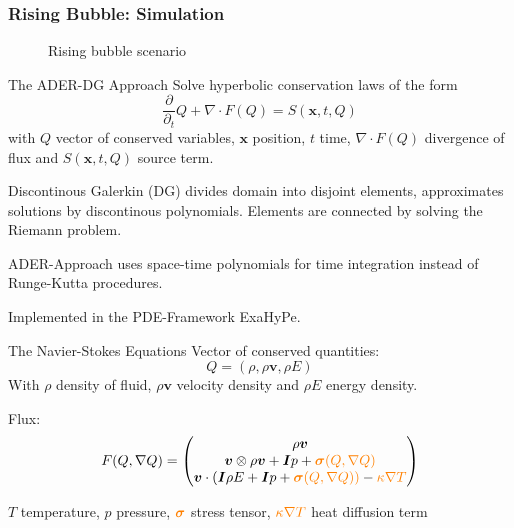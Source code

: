 \documentclass{beamer}
\newcommand{\Qrho}{\ensuremath{\rho}}
\newcommand{\Qj}{\ensuremath{\rho \bm{v}}}
\newcommand{\Qv}{\ensuremath{\bm{v}}}
\newcommand{\QE}{\ensuremath{\rho E}}
\newcommand{\stressT}{\ensuremath{\bm{\sigma}}}
\newcommand{\pressure}{\ensuremath{p}}
\begin{document}
\begin{frame}
  \frametitle{Rising Bubble: Simulation}
   \begin{figure}[h]
    \centering
    \caption{Rising bubble scenario}
  \end{figure}
\end{frame}

\begin{frame}{The ADER-DG Approach}
  Solve hyperbolic conservation laws of the form
\begin{equation}
  \label{eq:conservation-law}
 \frac{\partial}{\partial_t}  Q + \nabla \cdot F(Q) = S(\bm{x}, t, Q)
\end{equation}
with $Q$ vector of conserved variables, $\bm{x}$ position, $t$ time,  $\nabla \cdot F(Q)$ divergence of flux and $S(\bm{x}, t, Q)$ source term.

Discontinous Galerkin (DG) divides domain into disjoint elements, approximates solutions by discontinous polynomials.
Elements are connected by solving the Riemann problem.

ADER-Approach uses space-time polynomials for time integration instead of Runge-Kutta procedures.

Implemented in the PDE-Framework ExaHyPe.
\end{frame}

\begin{frame}{The Navier-Stokes Equations}
  Vector of conserved quantities:
\begin{equation}
  \label{eq:conserved-variables}
 Q = \left( \Qrho, \Qj, \QE \right) 
\end{equation}
With $\Qrho$ density of fluid, $\Qj$ velocity density and $\QE$ energy density.

Flux:
\begin{equation}
  F(Q, \nabla Q) = 
  \begin{pmatrix}
    \Qj \\
    \Qv  \otimes \Qj + \bm{I} \pressure + \textcolor{orange}{\stressT (Q, \nabla Q)}  \\
    \Qv \cdot (\bm{I} \QE + \bm{I} \pressure + \textcolor{orange}{\stressT (Q, \nabla Q))} -
    \textcolor{orange}{\kappa \nabla T}
  \end{pmatrix}
\end{equation}

$T$ temperature, $\pressure$ pressure,
$\textcolor{orange}{\stressT}$ stress tensor, $\textcolor{orange}{\kappa \nabla T}$ heat diffusion term
\end{frame}
\end{document}
